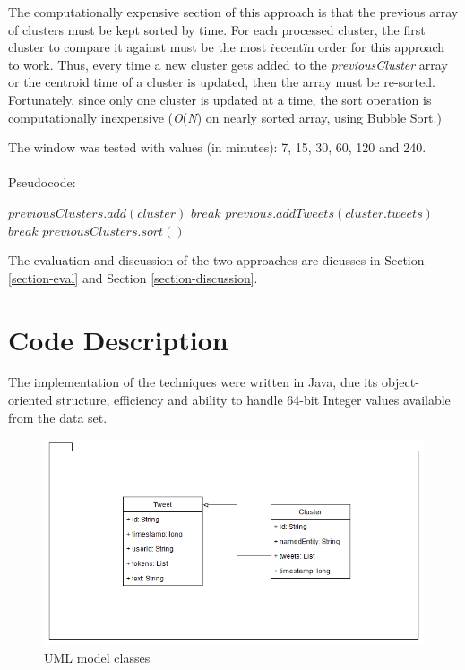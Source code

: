 \documentclass[a4paper,portrait,12pt]{article}
\begin{document}
\begin{enumerate}
	      The computationally expensive section of this approach is that the previous array of clusters must be kept sorted by time.
	      For each processed cluster, the first cluster to compare it against must be the most \"recent\" in order for this approach to work.
	      Thus, every time a new cluster gets added to the \textit{previousCluster} array or the centroid time of a cluster is updated, then the array must be re-sorted.\\
	      Fortunately, since only one cluster is updated at a time, the sort operation is computationally inexpensive (\textit{O}(\textit{N}) on nearly sorted array, using Bubble Sort.)

	      The window was tested with values (in minutes): 7, 15, 30, 60, 120 and 240.
	      \\\\
	      Pseudocode:
	      \begin{algorithmic}
		      \State $previousClusters.add(cluster)$
		      \State $break$
		      \EndIf
		      \State $previous.addTweets(cluster.tweets)$
		      \State $break$
		      \EndIf
		      \EndFor
		      \State $previousClusters.sort()$
		      \EndFor
	      \end{algorithmic}
\end{enumerate}

The evaluation and discussion of the two approaches are dicusses in Section \ref{section-eval} and Section \ref{section-discussion}.

\section{Code Description}
The implementation of the techniques were written in Java, due its object-oriented structure, efficiency and ability to handle 64-bit Integer values available from the data set.

\begin{figure}[h!]
	\centering
	\includegraphics[width=0.5\linewidth]{images/modelUML.png}
	\caption{UML model classes}
	\label{fig:modelUML}
\end{figure}
\end{document}
